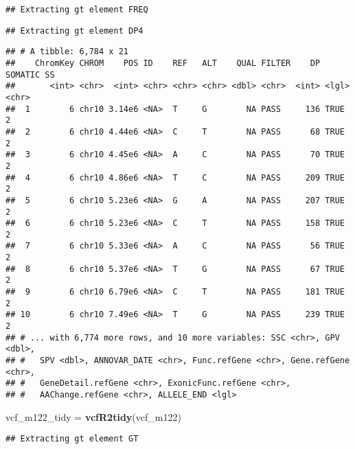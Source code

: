 \documentclass[]{article}
\newenvironment{Shaded}{\begin{snugshade}}{\end{snugshade}}
\newcommand{\KeywordTok}[1]{\textcolor[rgb]{0.13,0.29,0.53}{\textbf{#1}}}
\newcommand{\NormalTok}[1]{#1}
\newcommand{\OperatorTok}[1]{\textcolor[rgb]{0.81,0.36,0.00}{\textbf{#1}}}
\newcommand{\StringTok}[1]{\textcolor[rgb]{0.31,0.60,0.02}{#1}}
\begin{document}
\begin{verbatim}
## Extracting gt element FREQ
\end{verbatim}

\begin{verbatim}
## Extracting gt element DP4
\end{verbatim}

\begin{Shaded}
\end{Shaded}

\begin{verbatim}
## # A tibble: 6,784 x 21
##    ChromKey CHROM    POS ID    REF   ALT    QUAL FILTER    DP SOMATIC SS   
##       <int> <chr>  <int> <chr> <chr> <chr> <dbl> <chr>  <int> <lgl>   <chr>
##  1        6 chr10 3.14e6 <NA>  T     G        NA PASS     136 TRUE    2    
##  2        6 chr10 4.44e6 <NA>  C     T        NA PASS      68 TRUE    2    
##  3        6 chr10 4.45e6 <NA>  A     C        NA PASS      70 TRUE    2    
##  4        6 chr10 4.86e6 <NA>  T     C        NA PASS     209 TRUE    2    
##  5        6 chr10 5.23e6 <NA>  G     A        NA PASS     207 TRUE    2    
##  6        6 chr10 5.23e6 <NA>  C     T        NA PASS     158 TRUE    2    
##  7        6 chr10 5.33e6 <NA>  A     C        NA PASS      56 TRUE    2    
##  8        6 chr10 5.37e6 <NA>  T     G        NA PASS      67 TRUE    2    
##  9        6 chr10 6.79e6 <NA>  C     T        NA PASS     181 TRUE    2    
## 10        6 chr10 7.49e6 <NA>  T     G        NA PASS     239 TRUE    2    
## # ... with 6,774 more rows, and 10 more variables: SSC <chr>, GPV <dbl>,
## #   SPV <dbl>, ANNOVAR_DATE <chr>, Func.refGene <chr>, Gene.refGene <chr>,
## #   GeneDetail.refGene <chr>, ExonicFunc.refGene <chr>,
## #   AAChange.refGene <chr>, ALLELE_END <lgl>
\end{verbatim}

\begin{Shaded}
\begin{Highlighting}[]
\NormalTok{vcf_m122_tidy =}\StringTok{ }\KeywordTok{vcfR2tidy}\NormalTok{(vcf_m122)}
\end{Highlighting}
\end{Shaded}

\begin{verbatim}
## Extracting gt element GT
\end{verbatim}
\end{document}
